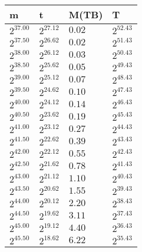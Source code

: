 \\\\
\begin{tabular}{llll}
m & t & M(TB) & T \\ \hline
$2^{37.00}$ & $2^{27.12}$ & $0.02$ & $2^{52.43}$ \\
$2^{37.50}$ & $2^{26.62}$ & $0.02$ & $2^{51.43}$ \\
$2^{38.00}$ & $2^{26.12}$ & $0.03$ & $2^{50.43}$ \\
$2^{38.50}$ & $2^{25.62}$ & $0.05$ & $2^{49.43}$ \\
$2^{39.00}$ & $2^{25.12}$ & $0.07$ & $2^{48.43}$ \\
$2^{39.50}$ & $2^{24.62}$ & $0.10$ & $2^{47.43}$ \\
$2^{40.00}$ & $2^{24.12}$ & $0.14$ & $2^{46.43}$ \\
$2^{40.50}$ & $2^{23.62}$ & $0.19$ & $2^{45.43}$ \\
$2^{41.00}$ & $2^{23.12}$ & $0.27$ & $2^{44.43}$ \\
$2^{41.50}$ & $2^{22.62}$ & $0.39$ & $2^{43.43}$ \\
$2^{42.00}$ & $2^{22.12}$ & $0.55$ & $2^{42.43}$ \\
$2^{42.50}$ & $2^{21.62}$ & $0.78$ & $2^{41.43}$ \\
$2^{43.00}$ & $2^{21.12}$ & $1.10$ & $2^{40.43}$ \\
$2^{43.50}$ & $2^{20.62}$ & $1.55$ & $2^{39.43}$ \\
$2^{44.00}$ & $2^{20.12}$ & $2.20$ & $2^{38.43}$ \\
$2^{44.50}$ & $2^{19.62}$ & $3.11$ & $2^{37.43}$ \\
$2^{45.00}$ & $2^{19.12}$ & $4.40$ & $2^{36.43}$ \\
$2^{45.50}$ & $2^{18.62}$ & $6.22$ & $2^{35.43}$ \\
\end{tabular}
\\\\ 
\\\\
